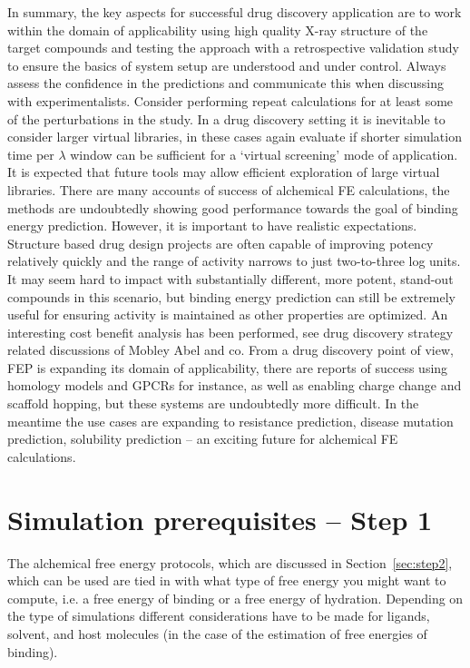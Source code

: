 \documentclass[9pt,bestpractices]{livecoms}
\begin{document}
In summary, the key aspects for successful drug discovery application are to work within the domain of applicability using high quality X-ray structure of the target compounds and testing the approach with a retrospective validation study to ensure the basics of system setup are understood and under control. Always assess the confidence in the predictions and communicate this when discussing with experimentalists. Consider performing repeat calculations for at least some of the perturbations in the study. In a drug discovery setting it is inevitable to consider larger virtual libraries, in these cases again evaluate if shorter simulation time per $\lambda$ window can be sufficient for a ‘virtual screening’ mode of application. It is expected that future tools may allow efficient exploration of large virtual libraries. There are many accounts of success of alchemical FE calculations, the methods are undoubtedly showing good performance towards the goal of binding energy prediction. However, it is important to have realistic expectations. Structure based drug design projects are often capable of improving potency relatively quickly and the range of activity narrows to just two-to-three log units. It may seem hard to impact with substantially different, more potent, stand-out compounds in this scenario, but binding energy prediction can still be extremely useful for ensuring activity is maintained as other properties are optimized. An interesting cost benefit analysis has been performed, see drug discovery strategy related discussions of Mobley Abel and co. From a drug discovery point of view, FEP is expanding its domain of applicability, there are reports of success using homology models and GPCRs for instance, as well as enabling charge change and scaffold hopping, but these systems are undoubtedly more difficult.  In the meantime the use cases are expanding to resistance prediction, disease mutation prediction, solubility prediction – an exciting future for alchemical FE calculations. 


%
%
%
%
\section{Simulation prerequisites -- Step 1}
\label{sec:step1}
The alchemical free energy protocols, which are discussed in Section~\ref{sec:step2}, which can be used are tied in with what type of free energy you might want to compute, i.e. a free energy of binding or a free energy of hydration. Depending on the type of simulations different considerations have to be made for ligands, solvent, and host molecules (in the case of the estimation of free energies of binding).
\end{document}
